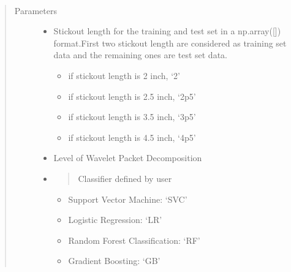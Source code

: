 \documentclass[letterpaper,10pt,english]{sphinxmanual}
\begin{document}
\begin{fulllineitems}
\label{\detokenize{WPT:WPT_Transfer_Learning_2case.WPT_Transfer_Learning_2case}}~\begin{quote}\begin{description}
\item[{Parameters}] \leavevmode\begin{itemize}
\item {} 
 \textendash{} 
Stickout length for the training and test set in a np.array({[}{]}) format.First two stickout length are considered as training set data and the remaining ones are test set data.
\begin{itemize}
\item {} 
if stickout length is 2 inch, ‘2’

\item {} 
if stickout length is 2.5 inch, ‘2p5’

\item {} 
if stickout length is 3.5 inch, ‘3p5’

\item {} 
if stickout length is 4.5 inch, ‘4p5’

\end{itemize}


\item {} 
 \textendash{} Level of Wavelet Packet Decomposition

\item {} 
 \textendash{} \begin{quote}

Classifier defined by user
\end{quote}
\begin{itemize}
\item {} 
Support Vector Machine: ‘SVC’

\item {} 
Logistic Regression: ‘LR’

\item {} 
Random Forest Classification: ‘RF’

\item {} 
Gradient Boosting: ‘GB’


\end{itemize}
\end{itemize}
\end{description}
\end{quote}
\end{fulllineitems}
\end{document}
